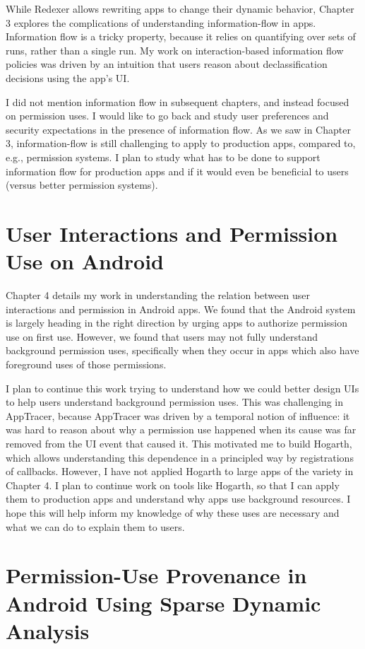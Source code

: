 While Redexer allows rewriting apps to change their dynamic behavior,
Chapter 3 explores the complications of understanding information-flow
in apps. Information flow is a tricky property, because it relies on
quantifying over sets of runs, rather than a single run. My work on
interaction-based information flow policies was driven by an intuition
that users reason about declassification decisions using the app's UI. 

I did not mention information flow in subsequent chapters, and instead
focused on permission uses. I would like to go back and study user
preferences and security expectations in the presence of information
flow. As we saw in Chapter 3, information-flow is still challenging to
apply to production apps, compared to, e.g., permission systems. I
plan to study what has to be done to support information flow for
production apps and if it would even be beneficial to users (versus
better permission systems).

\section{User Interactions and Permission Use on Android}

Chapter 4 details my work in understanding the relation between user
interactions and permission in Android apps. We found that the Android
system is largely heading in the right direction by urging apps to
authorize permission use on first use. However, we found that users
may not fully understand background permission uses, specifically when
they occur in apps which also have foreground uses of those
permissions.

I plan to continue this work trying to understand how we could better
design UIs to help users understand background permission uses. This
was challenging in AppTracer, because AppTracer was driven by a
temporal notion of influence: it was hard to reason about why a
permission use happened when its cause was far removed from the UI
event that caused it. This motivated me to build Hogarth, which allows
understanding this dependence in a principled way by registrations of
callbacks. However, I have not applied Hogarth to large apps of the
variety in Chapter 4. I plan to continue work on tools like Hogarth,
so that I can apply them to production apps and understand why apps
use background resources. I hope this will help inform my knowledge of
why these uses are necessary and what we can do to explain them to
users.

\section{Permission-Use Provenance in Android Using Sparse Dynamic Analysis}

